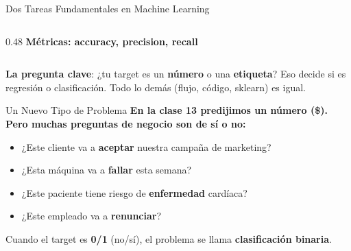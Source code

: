 \documentclass[aspectratio=169, 11pt]{beamer}
\begin{document}
\begin{frame}[shrink=8]{Dos Tareas Fundamentales en Machine Learning}
\begin{columns}[T]
\begin{column}{0.48\textwidth}
      \vspace{4pt}
      {\scriptsize\color{arcaRed}\bfseries
        Métricas: accuracy, precision, recall}
    \end{column}
  \end{columns}

  \vspace{8pt}
  {\footnotesize\color{arcaDark}
    \faLightbulb\hspace{4pt}
    \textbf{La pregunta clave}: ¿tu target es un \textbf{número} o una
    \textbf{etiqueta}? Eso decide si es regresión o clasificación.
    Todo lo demás (flujo, código, sklearn) es igual.}
\end{frame}

\begin{frame}[shrink=5]{Un Nuevo Tipo de Problema}
  \vspace{-4pt}
  {\footnotesize\color{arcaDark}\bfseries
    En la clase 13 predijimos un \textbf{número} (\$). Pero muchas preguntas
    de negocio son de \textbf{sí o no}:}

  \vspace{8pt}
  {\footnotesize
  \begin{itemize}\setlength{\itemsep}{6pt}
    \item[{\color{arcaRed}\faArrowRight}]
      ¿Este cliente va a \textbf{aceptar} nuestra campaña de marketing?
    \item[{\color{arcaRed}\faArrowRight}]
      ¿Esta máquina va a \textbf{fallar} esta semana?
    \item[{\color{arcaRed}\faArrowRight}]
      ¿Este paciente tiene riesgo de \textbf{enfermedad} cardíaca?
    \item[{\color{arcaRed}\faArrowRight}]
      ¿Este empleado va a \textbf{renunciar}?
  \end{itemize}
  }

  \vspace{8pt}
  {\footnotesize\color{arcaDark}
    \faLightbulb\hspace{4pt}
    Cuando el target es \textbf{0/1} (no/sí), el problema se llama
    \textbf{clasificación binaria}.}
\end{frame}
\end{document}
